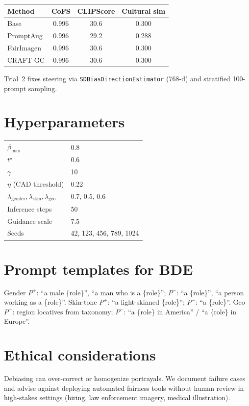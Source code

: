 \documentclass[11pt,a4paper]{article}
\begin{document}
\begin{tabular}{lccc}
  \toprule
  Method & CoFS & CLIPScore & Cultural sim \\
  \midrule
  Base & 0.996 & 30.6 & 0.300 \\
  PromptAug & 0.996 & 29.2 & 0.288 \\
  FairImagen & 0.996 & 30.6 & 0.300 \\
  CRAFT-GC & 0.996 & 30.6 & 0.300 \\
  \bottomrule
\end{tabular}

Trial~2 fixes steering via \texttt{SDBiasDirectionEstimator} (768-d) and stratified 100-prompt sampling.

\section{Hyperparameters}
\label{app:hyper}
\begin{tabular}{ll}
  $\beta_{\max}$ & 0.8 \\
  $t^\star$ & 0.6 \\
  $\gamma$ & 10 \\
  $\eta$ (CAD threshold) & 0.22 \\
  $\lambda_{\mathrm{gender}}, \lambda_{\mathrm{skin}}, \lambda_{\mathrm{geo}}$ & 0.7, 0.5, 0.6 \\
  Inference steps & 50 \\
  Guidance scale & 7.5 \\
  Seeds & 42, 123, 456, 789, 1024 \\
\end{tabular}

\section{Prompt templates for BDE}
Gender $P^+$: ``a male \{role\}'', ``a man who is a \{role\}''; $P^-$: ``a \{role\}'', ``a person working as a \{role\}''. Skin-tone $P^+$: ``a light-skinned \{role\}''; $P^-$: ``a \{role\}''. Geo $P^+$: region locatives from taxonomy; $P^-$: ``a \{role\} in America'' / ``a \{role\} in Europe''.

\section{Ethical considerations}
Debiasing can over-correct or homogenize portrayals. We document failure cases and advise against deploying automated fairness tools without human review in high-stakes settings (hiring, law enforcement imagery, medical illustration).
\end{document}
